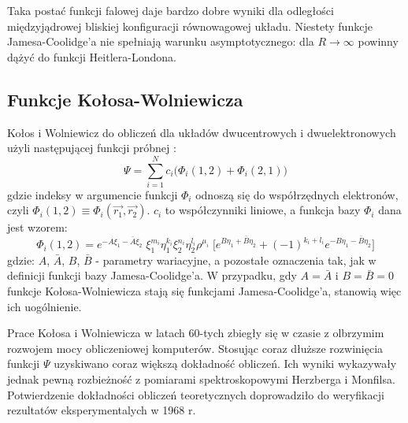 \documentclass[a4paper,12pt]{article}
\numberwithin{equation}{section}
\numberwithin{table}{section}
\numberwithin{figure}{section}
\begin{document}
Taka postać funkcji falowej daje bardzo dobre wyniki dla odległości międzyjądrowej bliskiej konfiguracji równowagowej układu. Niestety funkcje Jamesa-Coolidge'a nie spełniają warunku asymptotycznego: dla $R \rightarrow \infty$ powinny dążyć do funkcji Heitlera-Londona.

\subsection{Funkcje Kołosa-Wolniewicza}
Kołos i Wolniewicz do obliczeń dla układów dwucentrowych i dwuelektronowych użyli następującej funkcji próbnej \cite{piela}:
\begin{equation}
\Psi = \sum\limits_{i=1}^N c_i \big(\Phi_i(1,2) + \Phi_i(2,1)\big)
\end{equation}
gdzie indeksy w argumencie funkcji $\Phi_i$ odnoszą się do współrzędnych elektronów, czyli $\Phi_i(1,2) \equiv \Phi_i(\vec{r_1},\vec{r_2})$. $c_i$ to współczynniki liniowe, a funkcja bazy $\Phi_i$ dana jest wzorem:
\begin{equation}
\Phi_i(1,2) = e^{-A\xi_1 - \bar{A} \xi_2} \; \xi_1^{m_i} \eta_1^{k_i} \xi_2^{n_i} \eta_2^{l_i} \rho^{\mu_i} \; \big[e^{B\eta_1 + \bar{B} \eta_2} + (-1)^{k_i + l_i} e^{-B\eta_1 - \bar{B}\eta_2} \big]
\end{equation}
gdzie: $A$, $\bar{A}$, $B$, $\bar{B}$ - parametry wariacyjne, a pozostałe oznaczenia tak, jak w definicji funkcji bazy Jamesa-Coolidge'a. W przypadku, gdy $A = \bar{A}$ i $B = \bar{B} = 0$ funkcje Kołosa-Wolniewicza stają się funkcjami Jamesa-Coolidge'a, stanowią więc ich uogólnienie.

Prace Kołosa i Wolniewicza w latach 60-tych zbiegły się w czasie z olbrzymim rozwojem mocy obliczeniowej komputerów. Stosując coraz dłuższe rozwinięcia funkcji $\Psi$ uzyskiwano coraz większą dokładność obliczeń. Ich wyniki wykazywały jednak pewną rozbieżność z pomiarami spektroskopowymi Herzberga i Monfilsa. Potwierdzenie dokładności obliczeń teoretycznych doprowadziło do weryfikacji rezultatów eksperymentalych w 1968 r. \cite{kolos68_improv,kolos68_disc}
%
%
\newpage
\end{document}
